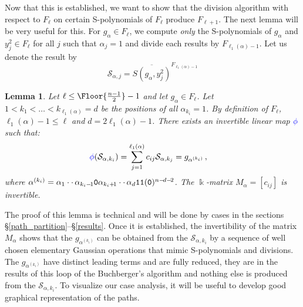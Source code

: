 \documentclass[12pt,reqno]{amsart}
\theoremstyle{plain}
\newtheorem{lemma}[theorem]{Lemma}
\theoremstyle{definition}
\DeclarePairedDelimiter\Floor\lfloor\rfloor
\def\field{\Bbbk}
\begin{document}
Now that this is established, we want to  show that the division algorithm with respect to $F_\ell$ on certain S-polynomials of $F_\ell$ produce $F_{\ell+1}$.
The next lemma will be very useful for this.
For $g_\alpha\in F_\ell$, we compute {\sl only} the S-polynomials of $g_\alpha$ and $y_j^2\in F_\ell$ for all $j$ such that $\alpha_j=1$ and divide each results by $F_{\ell_1(\alpha)-1}$.
Let us denote the result by
	$$\mathcal{S}_{\alpha, {j}} = \overline{S(g_{\alpha}, y^{2}_{j})}^{F_{\ell_1(\alpha)-1}}$$
\begin{lemma}
	\label{lemma_phi_map} Let $\ell \le \Floor{\frac{n-1}{2}}-1$
	and let $g_\alpha\in F_\ell$.
	Let  $1<k_1 < \dots < k_{\ell_1(\alpha)}= d$ be the positions of all $\alpha_{k_i} = 1$. By definition of $F_\ell$, $\ell_1(\alpha)-1\le\ell$ and $d=2\ell_1(\alpha)-1$.
	There exists an invertible linear map $\color{blue} \phi$ such that:
	\vskip -18pt
	\begin{align*}
	    \textnormal{$\color{blue} \phi$}(\mathcal{S}_{\alpha, k_i}) = \sum_{j=1}^{\ell_1(\alpha)} c_{ij} \mathcal{S}_{\alpha, {k_{j}}} &= g_{\alpha^{(k_i)}}\,,
	\end{align*}
	where $\alpha^{(k_i)} = \alpha_1 \cdot\cdot\, \alpha_{k_{i}-\!1} \textnormal{\texttt{0}} \alpha_{k_{i}+\!1} \cdot\cdot\, \alpha_{d}  
	\textnormal{\texttt{11}} (\textnormal{\texttt{0}})^{n-\!d-\!2}$.
	The $\field$-matrix $M_\alpha=[c_{ij}]$ is invertible.
\end{lemma}

The proof of this lemma is technical and will be done by cases in the sections \S\ref{path_partition}--\S\ref{results}.
Once it is established, the invertibility of the matrix $M_\alpha$ shows that the $g_{\alpha^{(k_i)}}$ can be obtained from the $\mathcal{S}_{\alpha, k_i}$
by a sequence of well chosen elementary Gaussian operations that mimic S-polynomials and divisions. The $g_{\alpha^{(k_i)}}$ have distinct leading terms 
and are fully reduced, they are in the results of this loop of the Buchberger's algorithm and nothing else is produced from the $\mathcal{S}_{\alpha, k_i}$.
To visualize our case analysis, it will be useful to develop good graphical representation of the paths.
\end{document}
